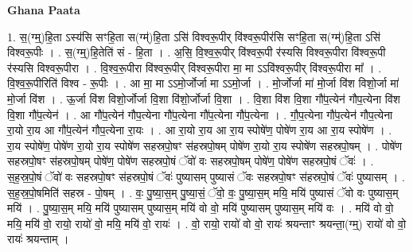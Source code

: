 \documentclass[17pt]{extarticle}
\begin{document}
\textbf{Ghana Paata } \newline

1. स॒(ग्म्॒)हि॒ता ऽस्य॑सि सꣳहि॒ता स(ग्म्॑)हि॒ता ऽसि॑ विश्वरू॒पीर् वि॑श्वरू॒पीर॑सि सꣳहि॒ता स(ग्म्॑)हि॒ता ऽसि॑ विश्वरू॒पीः । . स॒(ग्म्॒)हि॒तेति॑ सं - हि॒ता । . अ॒सि॒ वि॒श्व॒रू॒पीर् वि॑श्वरू॒पी र॑स्यसि विश्वरू॒पीरा वि॑श्वरू॒पी र॑स्यसि विश्वरू॒पीरा । . वि॒श्व॒रू॒पीरा वि॑श्वरू॒पीर् वि॑श्वरू॒पीरा मा॒ मा ऽऽवि॑श्वरू॒पीर् वि॑श्वरू॒पीरा मा᳚ । . वि॒श्व॒रू॒पीरिति॑ विश्व - रू॒पीः । . आ मा॒ मा ऽऽमो॒र्जोर्जा मा ऽऽमो॒र्जा । . मो॒र्जोर्जा मा॑ मो॒र्जा वि॑श विशो॒र्जा मा॑ मो॒र्जा वि॑श । . ऊ॒र्जा वि॑श विशो॒र्जोर्जा वि॒शा वि॑शो॒र्जोर्जा वि॒शा । . वि॒शा वि॑श वि॒शा गौ॑प॒त्येन॑ गौप॒त्येना वि॑श वि॒शा गौ॑प॒त्येन॑ । . आ गौ॑प॒त्येन॑ गौप॒त्येना गौ॑प॒त्येना गौ॑प॒त्येना गौ॑प॒त्येना । . गौ॒प॒त्येना गौ॑प॒त्येन॑ गौप॒त्येना रा॒यो रा॒य आ गौ॑प॒त्येन॑ गौप॒त्येना रा॒यः । . आ रा॒यो रा॒य आ रा॒य स्पोषे॑ण॒ पोषे॑ण रा॒य आ रा॒य स्पोषे॑ण । . रा॒य स्पोषे॑ण॒ पोषे॑ण रा॒यो रा॒य स्पोषे॑ण सहस्रपो॒षꣳ स॑हस्रपो॒षम् पोषे॑ण रा॒यो रा॒य स्पोषे॑ण सहस्रपो॒षम् । . पोषे॑ण सहस्रपो॒षꣳ स॑हस्रपो॒षम् पोषे॑ण॒ पोषे॑ण सहस्रपो॒षं ॅवो॑ वः सहस्रपो॒षम् पोषे॑ण॒ पोषे॑ण सहस्रपो॒षं ॅवः॑ । . स॒ह॒स्र॒पो॒षं ॅवो॑ वः सहस्रपो॒षꣳ स॑हस्रपो॒षं ॅवः॑ पुष्यासम् पुष्यासं ॅवः सहस्रपो॒षꣳ स॑हस्रपो॒षं ॅवः॑ पुष्यासम् । . स॒ह॒स्र॒पो॒षमिति॑ सहस्र - पो॒षम् । . वः॒ पु॒ष्या॒स॒म् पु॒ष्या॒सं॒ ॅवो॒ वः॒ पु॒ष्या॒स॒म् मयि॒ मयि॑ पुष्यासं ॅवो वः पुष्यास॒म् मयि॑ । . पु॒ष्या॒स॒म् मयि॒ मयि॑ पुष्यासम् पुष्यास॒म् मयि॑ वो वो॒ मयि॑ पुष्यासम् पुष्यास॒म् मयि॑ वः । . मयि॑ वो वो॒ मयि॒ मयि॑ वो॒ रायो॒ रायो॑ वो॒ मयि॒ मयि॑ वो॒ रायः॑ । . वो॒ रायो॒ रायो॑ वो वो॒ रायः॑ श्रयन्ताꣳ श्रयन्ता॒(ग्म्॒) रायो॑ वो वो॒ रायः॑ श्रयन्ताम् । \newline
\end{document}
